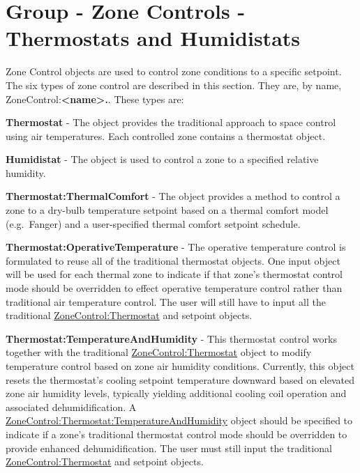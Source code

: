 \section{Group - Zone Controls - Thermostats and Humidistats}\label{group---zone-controls---thermostats-and-humidistats}

Zone Control objects are used to control zone conditions to a specific setpoint. The six types of zone control are described in this section. They are, by name, ZoneControl:\textbf{\textless{}name\textgreater{}.}. These types are:

\textbf{Thermostat} - The object provides the traditional approach to space control using air temperatures. Each controlled zone contains a thermostat object.

\textbf{Humidistat} - The object is used to control a zone to a specified relative humidity.

\textbf{Thermostat:ThermalComfort} - The object provides a method to control a zone to a dry-bulb temperature setpoint based on a thermal comfort model (e.g.~Fanger) and a user-specified thermal comfort setpoint schedule.

\textbf{Thermostat:OperativeTemperature} - The operative temperature control is formulated to reuse all of the traditional thermostat objects. One input object will be used for each thermal zone to indicate if that zone's thermostat control mode should be overridden to effect operative temperature control rather than traditional air temperature control. The user will still have to input all the traditional \hyperref[zonecontrolthermostat]{ZoneControl:Thermostat} and setpoint objects.

\textbf{Thermostat:TemperatureAndHumidity} - This thermostat control works together with the traditional \hyperref[zonecontrolthermostat]{ZoneControl:Thermostat} object to modify temperature control based on zone air humidity conditions. Currently, this object resets the thermostat's cooling setpoint temperature downward based on elevated zone air humidity levels, typically yielding additional cooling coil operation and associated dehumidification. A \hyperref[zonecontrolthermostattemperatureandhumidity]{ZoneControl:Thermostat:TemperatureAndHumidity} object should be specified to indicate if a zone's traditional thermostat control mode should be overridden to provide enhanced dehumidification. The user must still input the traditional \hyperref[zonecontrolthermostat]{ZoneControl:Thermostat} and setpoint objects.

